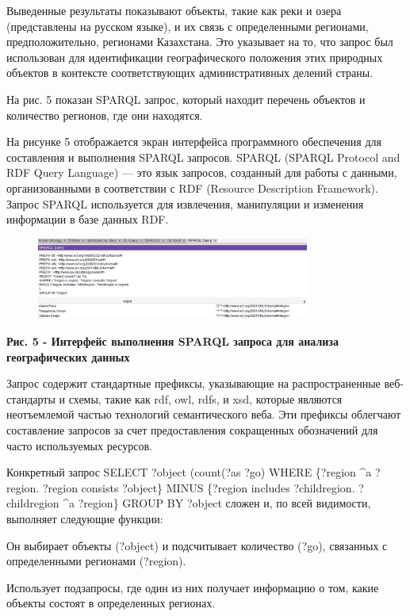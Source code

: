 Выведенные результаты показывают объекты, такие как реки и озера
(представлены на русском языке), и их связь с определенными регионами,
предположительно, регионами Казахстана. Это указывает на то, что запрос
был использован для идентификации географического положения этих
природных объектов в контексте соответствующих административных делений
страны.

На рис. 5 показан SPARQL запрос, который находит перечень объектов и
количество регионов, где они находятся.

На рисунке 5 отображается экран интерфейса программного обеспечения для
составления и выполнения SPARQL запросов. SPARQL (SPARQL Protocol and
RDF Query Language) --- это язык запросов, созданный для работы с
данными, организованными в соответствии с RDF (Resource Description
Framework). Запрос SPARQL используется для извлечения, манипуляции и
изменения информации в базе данных RDF.

\begin{figure}[H]
	\centering
	\includegraphics[width=0.8\textwidth]{assets/42}
	\caption*{}
\end{figure}

\textbf{Рис. 5 - Интерфейс выполнения SPARQL запроса для анализа
географических данных}

Запрос содержит стандартные префиксы, указывающие на распространенные
веб-стандарты и схемы, такие как rdf, owl, rdfs, и xsd, которые являются
неотъемлемой частью технологий семантического веба. Эти префиксы
облегчают составление запросов за счет предоставления сокращенных
обозначений для часто используемых ресурсов.

Конкретный запрос SELECT ?object (count(?as ?go) WHERE \{?region \^{}a
?region. ?region consists ?object\} MINUS \{?region includes
?childregion. ?childregion \^{}a ?region\} GROUP BY ?object сложен и, по
всей видимости, выполняет следующие функции:

Он выбирает объекты (?object) и подсчитывает количество (?go), связанных
с определенными регионами (?region).

Использует подзапросы, где один из них получает информацию о том, какие
объекты состоят в определенных регионах.

